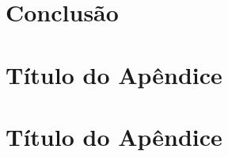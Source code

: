 \documentclass[
	12pt,				%
	openright,			%
	oneside,			%
	a4paper,			%
	english,			%
	french,				%
	spanish,			%
	brazil				%
	]{abntex2}
\begin{document}
\chapter{Conclusão}

\lipsum[21-23]

\postextual




\begin{apendicesenv}

\partapendices

\chapter{Título do Apêndice}

\lipsum[24]

\chapter{Título do Apêndice}
\lipsum[25-27]

\end{apendicesenv}


\end{document}
